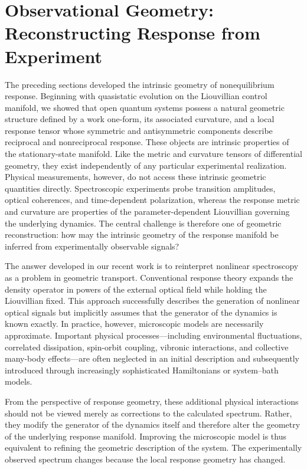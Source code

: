\section{Observational Geometry: Reconstructing Response from Experiment}
\label{sec:observational}
The preceding sections developed the intrinsic geometry of
nonequilibrium response. Beginning with quasistatic evolution on
the Liouvillian control manifold, we showed that open quantum
systems possess a natural geometric structure defined by a work
one-form, its associated curvature, and a local response tensor
whose symmetric and antisymmetric components describe reciprocal
and nonreciprocal response. These objects are intrinsic
properties of the stationary-state manifold. Like the metric and
curvature tensors of differential geometry, they exist
independently of any particular experimental realization.
Physical measurements, however, do not access these intrinsic
geometric quantities directly. Spectroscopic experiments probe
transition amplitudes, optical coherences, and time-dependent
polarization, whereas the response metric and curvature are
properties of the parameter-dependent Liouvillian governing the
underlying dynamics. The central challenge is therefore one of
geometric reconstruction: how may the intrinsic geometry of the
response manifold be inferred from experimentally observable
signals?

The answer developed in our recent work is to reinterpret
nonlinear spectroscopy as a problem in geometric transport.
Conventional response theory expands the density operator in
powers of the external optical field while holding the
Liouvillian fixed. This approach successfully describes the
generation of nonlinear optical signals but implicitly assumes
that the generator of the dynamics is known exactly. In practice,
however, microscopic models are necessarily approximate.
Important physical processes---including environmental
fluctuations, correlated dissipation, spin-orbit coupling,
vibronic interactions, and collective many-body effects---are
often neglected in an initial description and subsequently
introduced through increasingly sophisticated Hamiltonians or
system--bath models.

From the perspective of response geometry, these additional
physical interactions should not be viewed merely as corrections
to the calculated spectrum. Rather, they modify the generator of
the dynamics itself and therefore alter the geometry of the
underlying response manifold. Improving the microscopic model is
thus equivalent to refining the geometric description of the
system. The experimentally observed spectrum changes because the
local response geometry has changed.

